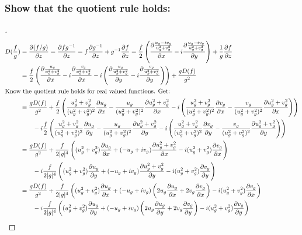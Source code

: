 \documentclass{article}
\begin{document}
 \subsubsection*{Show that the quotient rule holds:}
  \begin{proof}[\unskip \nopunct]
    \begin{align*}
      D(\frac{f}{g})  &= \frac{\partial (f/g)}{\partial z} = \frac{\partial fg^{-1}}{\partial z} = f\frac{\partial g^{-1}}{\partial z} + g^{-1}\frac{\partial f}{\partial z} = \frac{f}{2}\left(\frac{\partial \frac{u_g - iv_g}{u^2_g + v^2_g}}{\partial x} - i\frac{\partial \frac{u_g - iv_g}{u^2_g + v^2_g}}{\partial y} \right)+ \frac{1}{g}\frac{\partial f}{\partial z}\\
      &= \frac{f}{2}\left(\frac{\partial\frac{u_g}{u^2_g + v^2_g}}{\partial x} -i \frac{\partial \frac{v_g}{u^2_g + v^2_g}}{\partial x} -i\left( \frac{\partial\frac{u_g}{u^2_g + v^2_g}}{\partial y} -i \frac{\partial \frac{v_g}{u^2_g + v^2_g}}{\partial y}\right)\right)+ \frac{gD(f)}{g^2} \\
      \intertext{Know the quotient rule holds for real valued functions. Get:}
      &= \frac{g D(f)}{g^2} + \frac{f}{2}\left( \frac{u^2_g + v^2_g}{(u^2_g + v^2_g)^2}\frac{\partial u_g}{\partial x} -\frac{u_g}{(u^2_g + v^2_g)^2}\frac{\partial u^2_g + v^2_g}{\partial x} -i\left(\frac{u^2_g + v^2_g}{(u^2_g + v^2_g)^2}\frac{\partial v_g}{\partial x} -\frac{v_g}{(u^2_g + v^2_g)^2}\frac{\partial u^2_g + v^2_g}{\partial x}\right)\right) \\ &\qquad -i\frac{f}{2}\left(\frac{u^2_g + v^2_g}{(u^2_g + v^2_g)^2}\frac{\partial u_g}{\partial y} -\frac{u_g}{(u^2_g + v^2_g)^2}\frac{\partial u^2_g + v^2_g}{\partial y} -i\left(\frac{u^2_g + v^2_g}{(u^2_g + v^2_g)^2}\frac{\partial v_g}{\partial y} -\frac{v_g}{(u^2_g + v^2_g)^2}\frac{\partial u^2_g + v^2_g}{\partial y}\right)\right) \\
      &= \frac{g D(f)}{g^2} + \frac{f}{2|g|^4}\left( (u^2_g + v^2_g)\frac{\partial u_g}{\partial x} + (-u_g + iv_g)\frac{\partial u^2_g + v^2_g}{\partial x} -i(u^2_g + v^2_g)\frac{\partial v_g}{\partial x}\right) \\ &\qquad -i\frac{f}{2|g|^4}\left((u^2_g + v^2_g)\frac{\partial u_g}{\partial y} +(-u_g + iv_g)\frac{\partial u^2_g + v^2_g}{\partial y} -i(u^2_g + v^2_g)\frac{\partial v_g}{\partial y}\right)\\
      &= \frac{g D(f)}{g^2} + \frac{f}{2|g|^4}\left( (u^2_g + v^2_g)\frac{\partial u_g}{\partial x} + (-u_g + iv_g)\left(2u_g\frac{\partial u_g}{\partial x} + 2v_g\frac{\partial v_g}{\partial x}\right) -i(u^2_g + v^2_g)\frac{\partial v_g}{\partial x}\right) \\ &\qquad -i\frac{f}{2|g|^4}\left((u^2_g + v^2_g)\frac{\partial u_g}{\partial y} +(-u_g + iv_g)\left(2u_g\frac{\partial u_g}{\partial y} + 2v_g\frac{\partial v_g}{\partial y}\right) -i(u^2_g + v^2_g)\frac{\partial v_g}{\partial y}\right)\\

\end{align*}
\end{proof}
\end{document}
